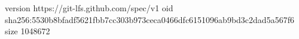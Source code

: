 version https://git-lfs.github.com/spec/v1
oid sha256:5530b8bfadf5621fbb7cc303b973ceca0466dfc6151096ab9bd3c2dad5a567f6
size 1048672
